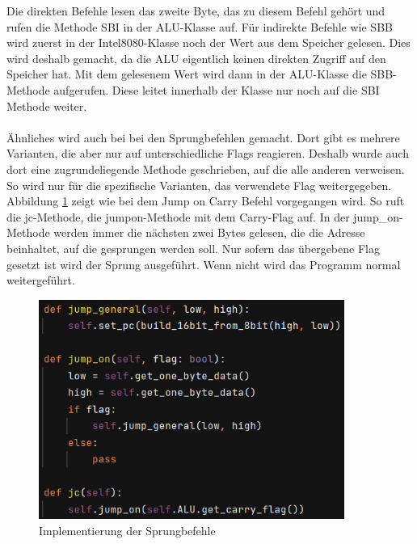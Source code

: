 \documentclass[12pt]{article}
\newcommand{\imgSpaceBefore}{\vspace{10pt}}
\begin{document}
\noindent
Die direkten Befehle lesen das zweite Byte, das zu diesem Befehl gehört und rufen die
Methode SBI in der ALU-Klasse auf. Für indirekte Befehle wie SBB wird zuerst in der Intel8080-Klasse noch der Wert aus dem Speicher gelesen. Dies wird deshalb gemacht, da die ALU eigentlich keinen direkten Zugriff auf den Speicher hat. Mit dem gelesenem Wert wird dann in der ALU-Klasse die SBB-Methode aufgerufen. Diese leitet innerhalb der Klasse nur noch auf die SBI Methode weiter.
\\\\
Ähnliches wird auch bei bei den Sprungbefehlen gemacht. Dort gibt es mehrere Varianten, die aber nur auf unterschiedliche Flags reagieren. Deshalb wurde auch dort eine zugrundeliegende Methode geschrieben, auf die alle anderen verweisen. So wird nur für die spezifische Varianten, das verwendete Flag weitergegeben.  Abbildung \ref{fig:JumpVariants} zeigt wie bei dem Jump on Carry Befehl vorgegangen wird. So ruft die jc-Methode, die jump\-on-Methode mit dem Carry-Flag auf. In der jump\_on-Methode werden immer die nächsten zwei Bytes gelesen, die die Adresse beinhaltet, auf die gesprungen werden soll. Nur sofern das übergebene Flag gesetzt ist wird der Sprung ausgeführt. Wenn nicht wird das Programm normal weitergeführt.

\imgSpaceBefore
\begin{figure}[H]
\centering
\includegraphics[width=10cm]{Bilder/JumpVariants}
\caption{Implementierung der Sprungbefehle}
\label{fig:JumpVariants}
\end{figure}
\end{document}
